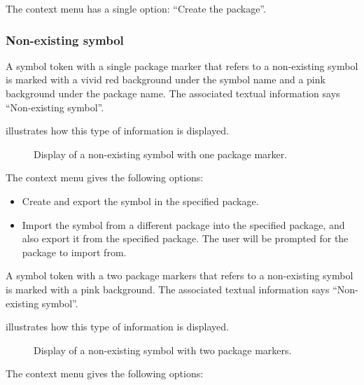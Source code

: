 The context menu has a single option: ``Create the package''.

\subsubsection{Non-existing symbol}

A symbol token with a single package marker that refers to a
non-existing symbol is marked with a vivid red background under the
symbol name and a pink background under the package name.  The
associated textual information says ``Non-existing symbol''.

 illustrates how this type of
information is displayed.

\begin{figure}
\begin{center}
\end{center}
\caption{\label{fig-non-existing-symbol}
Display of a non-existing symbol with one package marker.}
\end{figure}

The context menu gives the following options:

\begin{itemize}
\item Create and export the symbol in the specified package.
\item Import the symbol from a different package into the specified
  package, and also export it from the specified package.  The user
  will be prompted for the package to import from.
\end{itemize}

A symbol token with a two package markers that refers to a
non-existing symbol is marked with a pink background.  The
associated textual information says ``Non-existing symbol''.  

 illustrates how
this type of information is displayed.

\begin{figure}
\begin{center}
\end{center}
\caption{\label{fig-non-existing-symbol-two-package-markers}
Display of a non-existing symbol with two package markers.}
\end{figure}

The context menu gives the following options:

